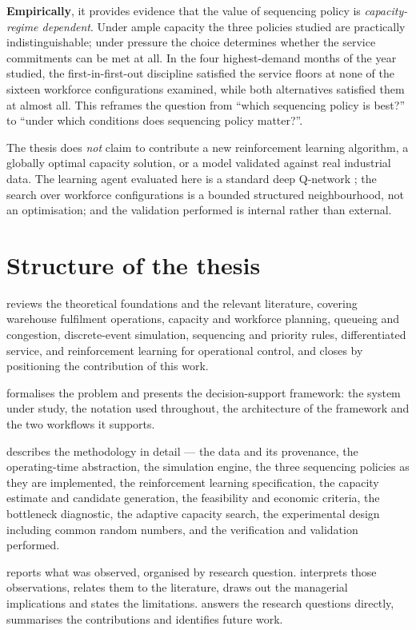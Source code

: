 \textbf{Empirically}, it provides evidence that the value of sequencing policy is
\emph{capacity-regime dependent}. Under ample capacity the three policies studied are
practically indistinguishable; under pressure the choice determines whether the service
commitments can be met at all. In the four highest-demand months of the year studied, the
first-in-first-out discipline satisfied the service floors at none of the sixteen workforce
configurations examined, while both alternatives satisfied them at almost all. This reframes
the question from ``which sequencing policy is best?'' to ``under which conditions does
sequencing policy matter?''.

The thesis does \emph{not} claim to contribute a new reinforcement learning algorithm, a
globally optimal capacity solution, or a model validated against real industrial data. The
learning agent evaluated here is a standard deep Q-network \citep{mnih2015}; the search over
workforce configurations is a bounded structured neighbourhood, not an optimisation; and the
validation performed is internal rather than external.

\section{Structure of the thesis}
\label{sec:structure}

 reviews the theoretical foundations and the relevant literature, covering
warehouse fulfilment operations, capacity and workforce planning, queueing and congestion,
discrete-event simulation, sequencing and priority rules, differentiated service, and
reinforcement learning for operational control, and closes by positioning the contribution of
this work.

 formalises the problem and presents the decision-support framework: the
system under study, the notation used throughout, the architecture of the framework and the
two workflows it supports.

 describes the methodology in detail --- the data and its provenance, the
operating-time abstraction, the simulation engine, the three sequencing policies as they are
implemented, the reinforcement learning specification, the capacity estimate and candidate
generation, the feasibility and economic criteria, the bottleneck diagnostic, the adaptive
capacity search, the experimental design including common random numbers, and the verification
and validation performed.

 reports what was observed, organised by research question.
 interprets those observations, relates them to the literature, draws out
the managerial implications and states the limitations.  answers the
research questions directly, summarises the contributions and identifies future work.
